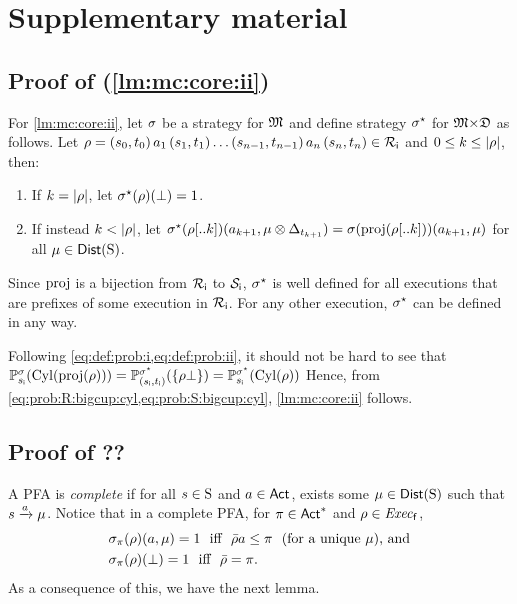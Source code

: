 
\section{Supplementary material}


\subsection{Proof of  (\cref{lm:mc:core:ii})}

For \cref{lm:mc:core:ii}, let $\strat$ be a strategy for
$\model$ and define strategy $\strat^\star$ for
$\model{\times}\dfa$ as follows.
%
Let
$\rho=(s_0,t_0)\, a_1\, (s_1,t_1)\ldots (s_{n-1},t_{n-1})\, a_n\, (s_n,t_n)\in\setRini$
and $0\leq k\leq\size{\rho}$, then:
%
\begin{enumerate}
\item%
  If $k=\size{\rho}$, let $\strat^\star(\rho)(\complete)=1$.
\item%
  If instead $k<\size{\rho}$, let
  $\strat^\star(\rho[..k])(a_{k+1},\mu\otimes\Dirac_{t_{k+1}})=\strat(\proj(\rho[..k]))(a_{k+1},\mu)$
  for all $\mu\in\Dist(\S)$.
\end{enumerate}
%
Since $\proj$ is a bijection from $\setRini$ to $\setSini$, 
$\strat^\star$ is well defined for all executions that are prefixes of
some execution in $\setRini$.
%
For any other execution, $\strat^\star$ can be defined in any way.

Following \cref{eq:def:prob:i,eq:def:prob:ii}, it should not be hard
to see that
%
$\Prob^{\strat}_{\sini}(\Cyl(\proj(\rho))) =
\Prob^{\strat^\star}_{(\sini,\tini)}(\{\rho\complete\}) =
\Prob^{\strat^\star}_{\sini}(\Cyl(\rho))$
%
Hence, from \cref{eq:prob:R:bigcup:cyl,eq:prob:S:bigcup:cyl},
\cref{lm:mc:core:ii} follows.

\subsection{Proof of ??}

A PFA is \emph{complete} if for all $s\in\S$ and $a\in\Act$, exists
some $\mu\in\Dist(\S)$ such that $s\reach{a}\mu$.
%
Notice that in a complete PFA, for $\plan\in\Act^*$ and
$\rho\in\execf$,
\begin{align}
  &\strat_\plan(\rho)(a,\mu)=1 \text{ \ iff \ } \bar{\rho}a\leq\plan \text{ \ (for a unique } \mu \text{), and} \label{eq:strat:plan:complete:i}\\
  &\strat_\plan(\rho)(\complete)=1 \text{ \ iff \ } \bar{\rho}=\plan. \label{eq:strat:plan:complete:ii}
\end{align}
%
As a consequence of this, we have the next lemma.

